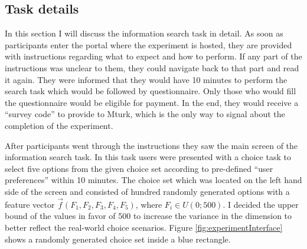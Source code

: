\documentclass[a4paper,12pt]{article}
\begin{document}
\subsection{Task details}

In this section I will discuss the information search task in detail. As soon as participants enter the portal where the experiment is hosted, they are provided with instructions regarding what to expect and how to perform. If any part of the instructions was unclear to them, they could navigate back to that part and read it again. They were informed that they would have 10 minutes to perform the search task which would be followed by questionnaire. Only those who would fill the questionnaire would be eligible for payment. In the end, they would receive a ``survey code'' to provide to Mturk, which is the only way to signal about the completion of the experiment. 

After participants went through the instructions they saw the main screen of the information search task. In this task users were presented with a choice task to select five options from the given choice set according to pre-defined ``user preferences'' within 10 minutes. The choice set which was located on the left hand side of the screen and consisted of hundred randomly generated options with a feature vector $\vec f(F_1, F_2, F_3, F_4, F_5)$, where $ F_i \in U(0; 500)$. I decided the upper bound of the values in favor of 500 to increase the variance in the dimension to better reflect the real-world choice scenarios. Figure \ref{fig:experimentInterface} shows a randomly generated choice set inside a blue rectangle.
\end{document}
